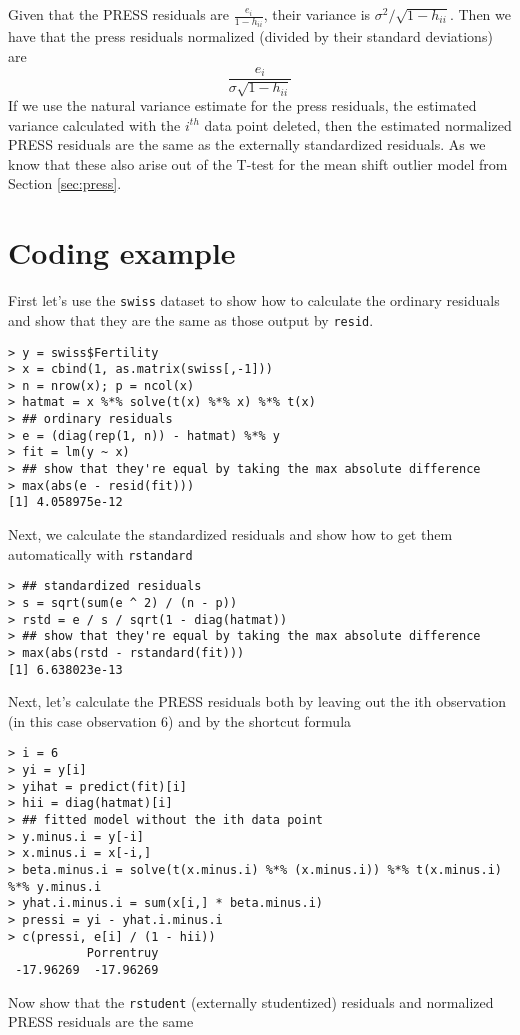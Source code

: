 Given that the PRESS residuals are $\frac{e_i}{1 - h_{ii}}$, their variance is
$\sigma^2 / \sqrt{1 - h_{ii}}$. Then we have that the press residuals normalized (divided
by their standard deviations) are 
$$
\frac{e_i}{\sigma \sqrt{1 - h_{ii}}}
$$
If we use the natural variance estimate for the press residuals, the estimated variance calculated with
the $i^{th}$ data point deleted, then the estimated normalized PRESS residuals are the same as the
externally standardized residuals. As we know that these also arise out of the T-test for the
mean shift outlier model from Section \ref{sec:press}. 

\section{Coding example}
First let's use the \texttt{swiss} dataset to show how to calculate
the ordinary residuals and show that they are the same as those
output by \texttt{resid}.
\begin{verbatim}
> y = swiss$Fertility
> x = cbind(1, as.matrix(swiss[,-1]))
> n = nrow(x); p = ncol(x)
> hatmat = x %*% solve(t(x) %*% x) %*% t(x)
> ## ordinary residuals
> e = (diag(rep(1, n)) - hatmat) %*% y
> fit = lm(y ~ x)
> ## show that they're equal by taking the max absolute difference
> max(abs(e - resid(fit)))
[1] 4.058975e-12
\end{verbatim}
Next, we calculate the standardized residuals and show how to get
them automatically with \texttt{rstandard}
\begin{verbatim}
> ## standardized residuals
> s = sqrt(sum(e ^ 2) / (n - p))
> rstd = e / s / sqrt(1 - diag(hatmat))
> ## show that they're equal by taking the max absolute difference
> max(abs(rstd - rstandard(fit)))
[1] 6.638023e-13
\end{verbatim}
Next, let's calculate the PRESS residuals both by
leaving out the ith observation (in this case observation 6)
and by the shortcut formula
\begin{verbatim}
> i = 6
> yi = y[i]
> yihat = predict(fit)[i]
> hii = diag(hatmat)[i]
> ## fitted model without the ith data point
> y.minus.i = y[-i]
> x.minus.i = x[-i,]
> beta.minus.i = solve(t(x.minus.i) %*% (x.minus.i)) %*% t(x.minus.i) %*% y.minus.i
> yhat.i.minus.i = sum(x[i,] * beta.minus.i)
> pressi = yi - yhat.i.minus.i
> c(pressi, e[i] / (1 - hii))
           Porrentruy 
 -17.96269  -17.96269 
\end{verbatim}
Now show that the \texttt{rstudent} (externally studentized) residuals and normalized
PRESS residuals are the same
